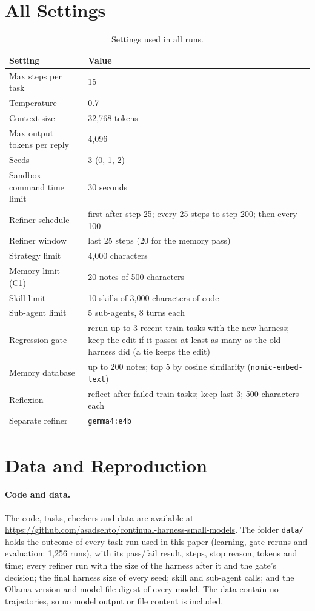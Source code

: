 \section{All Settings}
\label{app:settings}

\begin{table}[H]
\centering
\small
\begin{tabular}{lL{9.6cm}}
\toprule
Setting & Value \\
\midrule
Max steps per task & 15 \\
Temperature & 0.7 \\
Context size & 32{,}768 tokens \\
Max output tokens per reply & 4{,}096 \\
Seeds & 3 (0, 1, 2) \\
Sandbox command time limit & 30 seconds \\
Refiner schedule & first after step 25; every 25 steps to step 200; then every 100 \\
Refiner window & last 25 steps (20 for the memory pass) \\
Strategy limit & 4{,}000 characters \\
Memory limit (C1) & 20 notes of 500 characters \\
Skill limit & 10 skills of 3{,}000 characters of code \\
Sub-agent limit & 5 sub-agents, 8 turns each \\
Regression gate & rerun up to 3 recent train tasks with the new harness; keep the edit if it passes at least as many as the old harness did (a tie keeps the edit) \\
Memory database & up to 200 notes; top 5 by cosine similarity (\texttt{nomic-embed-text}) \\
Reflexion & reflect after failed train tasks; keep last 3; 500 characters each \\
Separate refiner & \texttt{gemma4:e4b} \\
\bottomrule
\end{tabular}
\caption{Settings used in all runs.}
\label{tab:settings}
\end{table}

\section{Data and Reproduction}
\label{app:repro}

\paragraph{Code and data.}
The code, tasks, checkers and data are available at
\url{https://github.com/asadsehto/continual-harness-small-models}. The folder \texttt{data/} holds
the outcome of every task run used in this paper (learning, gate reruns and evaluation: 1{,}256
runs), with its pass/fail result, steps, stop reason, tokens and time; every refiner run with the
size of the harness after it and the gate's decision; the final harness size of every seed; skill and
sub-agent calls; and the Ollama version and model file digest of every model. The data contain no
trajectories, so no model output or file content is included.

